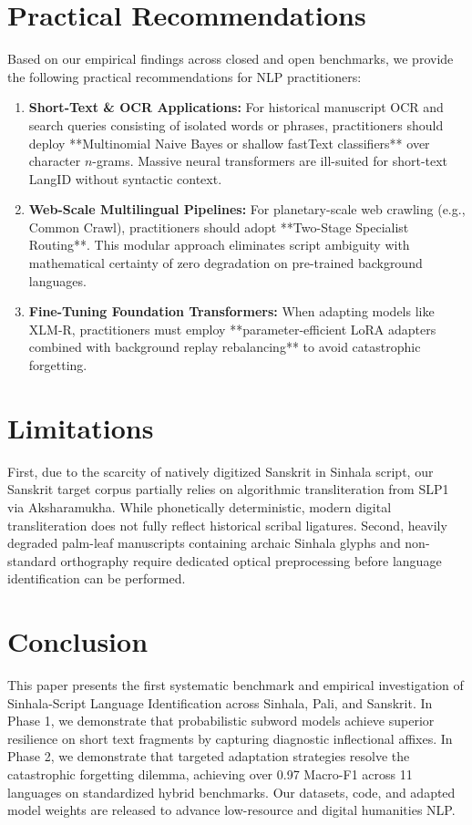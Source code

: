\documentclass[11pt]{article}
\begin{document}
\section{Practical Recommendations}
Based on our empirical findings across closed and open benchmarks, we provide the following practical recommendations for NLP practitioners:
\begin{enumerate}
    \item \textbf{Short-Text & OCR Applications:} For historical manuscript OCR and search queries consisting of isolated words or phrases, practitioners should deploy **Multinomial Naive Bayes or shallow fastText classifiers** over character $n$-grams. Massive neural transformers are ill-suited for short-text LangID without syntactic context.
    \item \textbf{Web-Scale Multilingual Pipelines:} For planetary-scale web crawling (e.g., Common Crawl), practitioners should adopt **Two-Stage Specialist Routing**. This modular approach eliminates script ambiguity with mathematical certainty of zero degradation on pre-trained background languages.
    \item \textbf{Fine-Tuning Foundation Transformers:} When adapting models like XLM-R, practitioners must employ **parameter-efficient LoRA adapters combined with background replay rebalancing** to avoid catastrophic forgetting.
\end{enumerate}

\section{Limitations}
First, due to the scarcity of natively digitized Sanskrit in Sinhala script, our Sanskrit target corpus partially relies on algorithmic transliteration from SLP1 via Aksharamukha. While phonetically deterministic, modern digital transliteration does not fully reflect historical scribal ligatures. Second, heavily degraded palm-leaf manuscripts containing archaic Sinhala glyphs and non-standard orthography require dedicated optical preprocessing before language identification can be performed.

\section{Conclusion}
This paper presents the first systematic benchmark and empirical investigation of Sinhala-Script Language Identification across Sinhala, Pali, and Sanskrit. In Phase 1, we demonstrate that probabilistic subword models achieve superior resilience on short text fragments by capturing diagnostic inflectional affixes. In Phase 2, we demonstrate that targeted adaptation strategies resolve the catastrophic forgetting dilemma, achieving over 0.97 Macro-F1 across 11 languages on standardized hybrid benchmarks. Our datasets, code, and adapted model weights are released to advance low-resource and digital humanities NLP.
\end{document}
